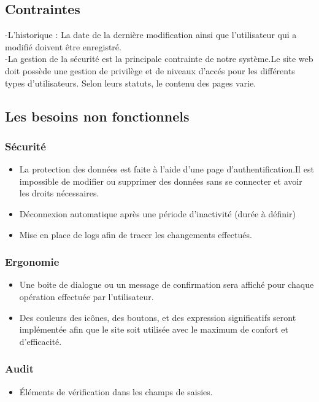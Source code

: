 \documentclass[12pt,a4paper]{article}
\begin{document}
\subsection{Contraintes}
-L'historique : La date de la dernière modification ainsi que l'utilisateur qui a modifié doivent être enregistré.\\
-La gestion de la sécurité est la principale contrainte de notre système.Le site web doit possède une gestion de privilège et de niveaux d'accés pour les différents types d'utilisateurs. Selon leurs statuts, le contenu des pages varie.
\subsection{Les besoins non fonctionnels}

\subsubsection{Sécurité}
\begin{itemize}
 \item La protection des données est faite à l'aide d'une page d'authentification.Il est impossible de modifier ou supprimer des données sans se connecter et avoir les droits nécessaires. 
 \item Déconnexion automatique après une période d'inactivité (durée à définir)
 \item Mise en place de logs afin de tracer les changements effectués.
\end{itemize}
\subsubsection{Ergonomie}
\begin{itemize}
\item Une boite de dialogue ou un message de confirmation sera affiché pour chaque opération effectuée par l'utilisateur.
\item Des couleurs des icônes, des boutons, et des expression significatifs seront implémentée afin que le site soit utilisée avec le maximum de confort et d'efficacité.
\end{itemize}
\subsubsection{Audit}
\begin{itemize}
\item Éléments de vérification dans les champs de saisies.
\end{itemize}
\end{document}
